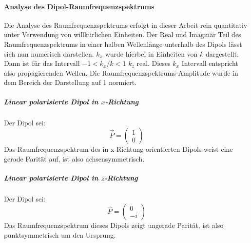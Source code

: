 \documentclass[titlepage]{article}
\begin{document}
	\paragraph{Analyse des Dipol-Raumfrequenzspektrums}
		Die Analyse des Raumfrequenzspektrums erfolgt in dieser Arbeit rein quantitativ unter Verwendung von willkürlichen Einheiten. Der Real und Imaginär Teil des Raumfrequenzspektrums in einer halben Wellenlänge unterhalb des Dipols lässt sich nun numerisch darstellen. $k_x$ wurde hierbei in Einheiten von $k$ dargestellt. Dann ist für das Intervall $-1 < k_x / k <1$ $k_z$ real. Dieses $k_x$ Intervall entspricht also propagierenden Wellen. Die Raumfrequenzspektrums-Amplitude wurde in dem Bereich der Darstellung auf 1 normiert.
		\subparagraph{Linear polarisierte Dipol in $x$-Richtung}
			Der Dipol sei:
			 $$\vec{P} = \begin{pmatrix} 1 \\ 0\end{pmatrix}$$
			Das Raumfrequenzspektrum des in x-Richtung orientierten Dipols weist eine gerade Parität auf, ist also achsensymmetrisch.	
		\subparagraph{Linear polarisierte Dipol in $z$-Richtung}
			Der Dipol sei:
			$$\vec{P} = \begin{pmatrix} 0 \\ -i\end{pmatrix}$$
			Das Raumfrequenzspektrum dieses Dipols zeigt ungerade Parität, ist also punktsymmetrisch um den Ursprung.
\end{document}
